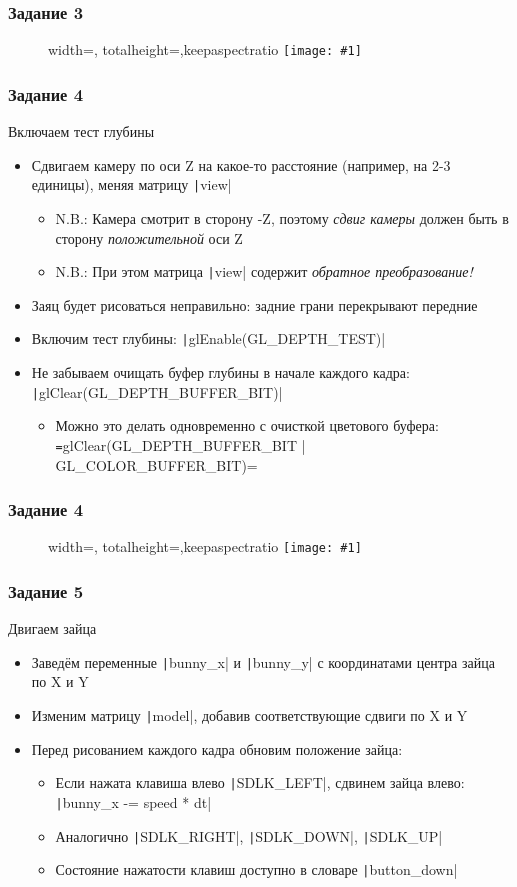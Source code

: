 \documentclass[10pt]{beamer}
\newcommand{\slideimage}[1]{
  \begin{figure}
    \begin{adjustbox}{width=\textwidth, totalheight=\textheight-2\baselineskip-2\baselineskip,keepaspectratio}
      \texttt{[image: \#1]}
    \end{adjustbox}
  \end{figure}
}
\begin{document}
\begin{frame}[fragile]
\frametitle{Задание 3}
\slideimage{3.png}
\end{frame}

\begin{frame}[fragile]
\frametitle{Задание 4}
Включаем тест глубины
\begin{itemize}
\item Сдвигаем камеру по оси Z на какое-то расстояние (например, на 2-3 единицы), меняя матрицу \texttt|view|
\begin{itemize}
\item N.B.: Камера смотрит в сторону -Z, поэтому \textit{сдвиг камеры} должен быть в сторону \textit{положительной} оси Z
\item N.B.: При этом матрица \texttt|view| содержит \textit{обратное преобразование!}
\end{itemize}
\item Заяц будет рисоваться неправильно: задние грани перекрывают передние
\item Включим тест глубины: \texttt|glEnable(GL_DEPTH_TEST)|
\item Не забываем очищать буфер глубины в начале каждого кадра: \texttt|glClear(GL_DEPTH_BUFFER_BIT)|
\begin{itemize}
\item Можно это делать одновременно с очисткой цветового буфера:  \texttt=glClear(GL_DEPTH_BUFFER_BIT | GL_COLOR_BUFFER_BIT)=
\end{itemize}
\end{itemize}
\end{frame}

\begin{frame}[fragile]
\frametitle{Задание 4}
\slideimage{4.png}
\end{frame}

\begin{frame}[fragile]
\frametitle{Задание 5}
Двигаем зайца
\begin{itemize}
\item Заведём переменные \texttt|bunny_x| и \texttt|bunny_y| с координатами центра зайца по X и Y
\item Изменим матрицу \texttt|model|, добавив соответствующие сдвиги по X и Y
\item Перед рисованием каждого кадра обновим положение зайца:
\begin{itemize}
\item Если нажата клавиша влево \texttt|SDLK_LEFT|, сдвинем зайца влево: \texttt|bunny_x -= speed * dt|
\item Аналогично \texttt|SDLK_RIGHT|, \texttt|SDLK_DOWN|, \texttt|SDLK_UP|
\item Состояние нажатости клавиш доступно в словаре \texttt|button_down|
\end{itemize}
\end{itemize}
\end{frame}
\end{document}
